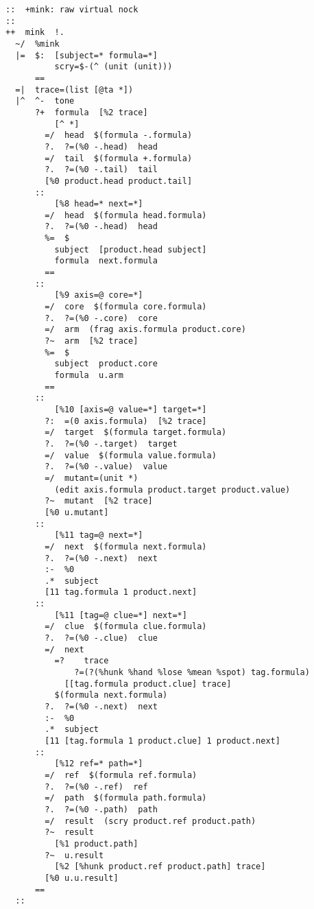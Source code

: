 \documentclass[twoside]{article}
\begin{document}
\begin{lstlisting}[style=listingcode]
::  +mink: raw virtual nock
::
++  mink  !.
  ~/  %mink
  |=  $:  [subject=* formula=*]
          scry=$-(^ (unit (unit)))
      ==
  =|  trace=(list [@ta *])
  |^  ^-  tone
      ?+  formula  [%2 trace]
          [^ *]
        =/  head  $(formula -.formula)
        ?.  ?=(%0 -.head)  head
        =/  tail  $(formula +.formula)
        ?.  ?=(%0 -.tail)  tail
        [%0 product.head product.tail]
      ::
          [%8 head=* next=*]
        =/  head  $(formula head.formula)
        ?.  ?=(%0 -.head)  head
        %=  $
          subject  [product.head subject]
          formula  next.formula
        ==
      ::
          [%9 axis=@ core=*]
        =/  core  $(formula core.formula)
        ?.  ?=(%0 -.core)  core
        =/  arm  (frag axis.formula product.core)
        ?~  arm  [%2 trace]
        %=  $
          subject  product.core
          formula  u.arm
        ==
      ::
          [%10 [axis=@ value=*] target=*]
        ?:  =(0 axis.formula)  [%2 trace]
        =/  target  $(formula target.formula)
        ?.  ?=(%0 -.target)  target
        =/  value  $(formula value.formula)
        ?.  ?=(%0 -.value)  value
        =/  mutant=(unit *)
          (edit axis.formula product.target product.value)
        ?~  mutant  [%2 trace]
        [%0 u.mutant]
      ::
          [%11 tag=@ next=*]
        =/  next  $(formula next.formula)
        ?.  ?=(%0 -.next)  next
        :-  %0
        .*  subject
        [11 tag.formula 1 product.next]
      ::
          [%11 [tag=@ clue=*] next=*]
        =/  clue  $(formula clue.formula)
        ?.  ?=(%0 -.clue)  clue
        =/  next
          =?    trace
              ?=(?(%hunk %hand %lose %mean %spot) tag.formula)
            [[tag.formula product.clue] trace]
          $(formula next.formula)
        ?.  ?=(%0 -.next)  next
        :-  %0
        .*  subject
        [11 [tag.formula 1 product.clue] 1 product.next]
      ::
          [%12 ref=* path=*]
        =/  ref  $(formula ref.formula)
        ?.  ?=(%0 -.ref)  ref
        =/  path  $(formula path.formula)
        ?.  ?=(%0 -.path)  path
        =/  result  (scry product.ref product.path)
        ?~  result
          [%1 product.path]
        ?~  u.result
          [%2 [%hunk product.ref product.path] trace]
        [%0 u.u.result]
      ==
  ::
\end{lstlisting}

\printbibliography
\end{document}
